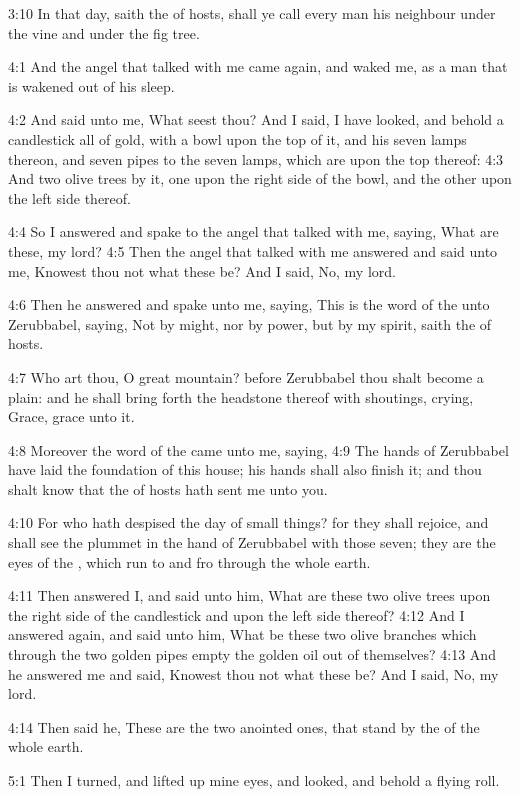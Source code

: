 3:10 In that day, saith the \LORD of hosts, shall ye call every man his
neighbour under the vine and under the fig tree.

4:1 And the angel that talked with me came again, and waked me, as a
man that is wakened out of his sleep.

4:2 And said unto me, What seest thou? And I said, I have looked, and
behold a candlestick all of gold, with a bowl upon the top of it, and
his seven lamps thereon, and seven pipes to the seven lamps, which are
upon the top thereof: 4:3 And two olive trees by it, one upon the
right side of the bowl, and the other upon the left side thereof.

4:4 So I answered and spake to the angel that talked with me, saying,
What are these, my lord?  4:5 Then the angel that talked with me
answered and said unto me, Knowest thou not what these be? And I said,
No, my lord.

4:6 Then he answered and spake unto me, saying, This is the word of
the \LORD unto Zerubbabel, saying, Not by might, nor by power, but by
my spirit, saith the \LORD of hosts.

4:7 Who art thou, O great mountain? before Zerubbabel thou shalt
become a plain: and he shall bring forth the headstone thereof with
shoutings, crying, Grace, grace unto it.

4:8 Moreover the word of the \LORD came unto me, saying, 4:9 The hands
of Zerubbabel have laid the foundation of this house; his hands shall
also finish it; and thou shalt know that the \LORD of hosts hath sent
me unto you.

4:10 For who hath despised the day of small things? for they shall
rejoice, and shall see the plummet in the hand of Zerubbabel with
those seven; they are the eyes of the \LORD, which run to and fro
through the whole earth.

4:11 Then answered I, and said unto him, What are these two olive
trees upon the right side of the candlestick and upon the left side
thereof?  4:12 And I answered again, and said unto him, What be these
two olive branches which through the two golden pipes empty the golden
oil out of themselves?  4:13 And he answered me and said, Knowest thou
not what these be? And I said, No, my lord.

4:14 Then said he, These are the two anointed ones, that stand by the
\LORD of the whole earth.

5:1 Then I turned, and lifted up mine eyes, and looked, and behold a
flying roll.

